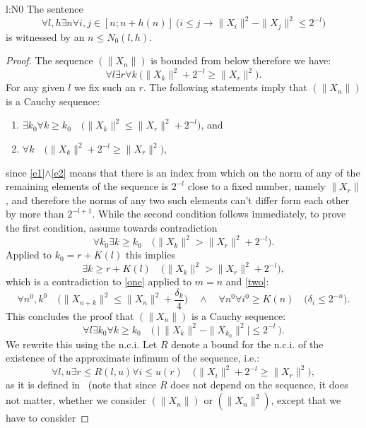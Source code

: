 \begin{lemma*}[$N_0$ is correct]{l:N0}
The sentence
\[
\forall l,h \exists n \forall i,j\in[n;n+h(n)]\ \big( i\leq j\rightarrow \|X_i\|^2-\|X_j\|^2\leq 2^{-l}\big)
\]
is witnessed by an $n\leq N_0(l,h)$.
\end{lemma*}
\begin{proof}
The sequence $(\|X_n\|)$ is bounded from below therefore we have:
\[ \forall l \exists r \forall k \ \big( \|X_k\|^2 + 2^{-l}\geq \|X_r\|^2\big).\]
For any given $l$ we fix such an $r$. The following statements 
imply that $(\|X_n\|)$ is a Cauchy sequence:
\begin{enumerate}
	\item\label{e1} $\exists k_0 \forall k\geq k_0 \quad \big(\|X_k\|^2\leq \|X_{r}\|^2 + 2^{-l}\big)$, and
	\item\label{e2} $\forall k \quad \big(\|X_k\|^2 + 2^{-l}\geq \|X_{r}\|^2\big) $,\\
\end{enumerate}
since \eqref{e1}$\wedge$\eqref{e2} means that there is an index
from which on the norm of any of the remaining elements of the sequence is $2^{-l}$ close to
a fixed number, namely $\|X_{r}\|$, and therefore the norms
of any two such elements can't differ form each other by more than $2^{-l+1}$.
While the second condition follows immediately, to prove the first condition, assume towards contradiction
\[\forall k_0 \exists k\geq k_0 \quad \big( \|X_k\|^2> \|X_{r}\|^2 + 2^{-l}\big).\]
Applied to $k_0 = r + K(l)$ this implies
\[ \exists k\geq r+K(l) \quad \big( \|X_k\|^2 > \|X_{r}\|^2 + 2^{-l}\big),\]
which is a contradiction to \eqref{one} applied to $m=n$ and  \eqref{two}:
\[ \forall n^0,k^0\quad \big( \|X_{n+k}\|^2 \leq \|X_{n}\|^2 + \frac{\delta_k}{4}\big) \quad\wedge\quad 
\forall n^0 \forall i^0\geq K(n)\quad  \big( \delta_i\leq 2^{-n}\big). \]
This concludes the proof that $(\|X_n\|)$ is a Cauchy sequence:
\[\forall l \exists k_0 \forall k\geq k_0 \quad  \Big(\ \big|\ \|X_k\|^2 - \|X_{k_0}\|^2 \big| \leq 2^{-l}\ \Big). \]
We rewrite this using the n.c.i. Let $R$ denote a bound for the n.c.i. of the existence
of the approximate infimum of the sequence, i.e.:
\[ \forall l,u \exists r\leq R(l,u) \forall i\leq u(r) 
	\quad \big( \|X_{i}\|^2 + 2^{-l}\geq \|X_{r}\|^2\big)\tag{R}\label{e:R},\]
as it is defined in~\cite{Kohlenbach08} (note that since $R$ does not depend on the sequence, it does not
matter, whether we consider $(\|X_n\|)$ or $(\|X_n\|^2)$, except that we have to consider

\end{proof}
